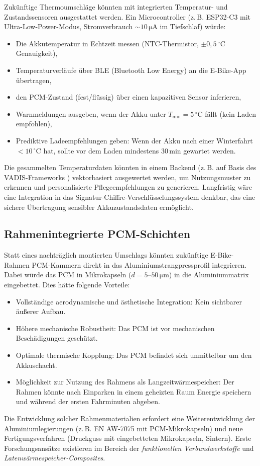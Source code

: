 ﻿\documentclass[a4paper,12pt]{article}
\theoremstyle{definition}
\begin{document}
Zuk\"unftige Thermoumschl\"age k\"onnten mit integrierten Temperatur- und Zustandssensoren ausgestattet werden. Ein Microcontroller (z.\,B. ESP32-C3 mit Ultra-Low-Power-Modus, Stromverbrauch $\sim 10\,\mathrm{\mu A}$ im Tiefschlaf) w\"urde:
\begin{itemize}
  \item Die Akkutemperatur in Echtzeit messen (NTC-Thermistor, $\pm 0{,}5\,{}^\circ\mathrm{C}$ Genauigkeit),
  \item Temperaturverl\"aufe \"uber BLE (Bluetooth Low Energy) an die E-Bike-App \"uber\-tragen,
  \item den PCM-Zustand (fest/fl\"ussig) \"uber einen kapazitiven Sensor inferieren,
  \item Warnmeldungen ausgeben, wenn der Akku unter $T_\mathrm{min} = 5\,{}^\circ\mathrm{C}$ f\"allt (kein Laden empfohlen),
  \item Prediktive Ladeempfehlungen geben: Wenn der Akku nach einer Winterfahrt $< 10\,{}^\circ\mathrm{C}$ hat, sollte vor dem Laden mindestens $30\,\mathrm{min}$ gewartet werden.
\end{itemize}
Die gesammelten Temperaturdaten k\"onnten in einem Backend (z.\,B. auf Basis des VADIS-Frameworks \cite{epp2026vadis}) vektorbasiert ausgewertet werden, um Nutzungsmuster zu erkennen und personalisierte Pflegeempfehlungen zu generieren. Langfristig w\"are eine Integration in das Signatur-Chiffre-Verschl\"usselungssystem \cite{epp2026signatur} denkbar, das eine sichere \"Ubertragung sensibler Akkuzustandsdaten erm\"oglicht.

\subsection{Rahmenintegrierte PCM-Schichten}

Statt eines nachtr\"aglich montierten Umschlags k\"onnten zuk\"unftige E-Bike-Rahmen PCM-Kammern direkt in das Aluminiumstrangpressprofil integrieren. Dabei w\"urde das PCM in Mikrokapseln ($d = 5$--$50\,\mathrm{\mu m}$) in die Aluminiummatrix eingebettet. Dies h\"atte folgende Vorteile:
\begin{itemize}
  \item Vollst\"andige aerodynamische und \"asthetische Integration: Kein sichtbarer \"au\ss{}erer Aufbau.
  \item H\"ohere mechanische Robustheit: Das PCM ist vor mechanischen Besch\"adigungen gesch\"utzt.
  \item Optimale thermische Kopplung: Das PCM befindet sich unmittelbar um den Akkuschacht.
  \item M\"oglichkeit zur Nutzung des Rahmens als Langzeitw\"armespeicher: Der Rahmen k\"onnte nach Einparken in einem geheizten Raum Energie speichern und w\"ahrend der ersten Fahrminuten abgeben.
\end{itemize}
Die Entwicklung solcher Rahmenmaterialien erfordert eine Weiterentwicklung der Aluminiumlegierungen (z.\,B. EN AW-7075 mit PCM-Mikrokapseln) und neue Fertigungsverfahren (Druckguss mit eingebetteten Mikrokapseln, Sintern). Erste Forschungsans\"atze existieren im Bereich der \emph{funktionellen Verbundwerkstoffe} und \emph{Latenw\"armespeicher-Composites}.
\end{document}
